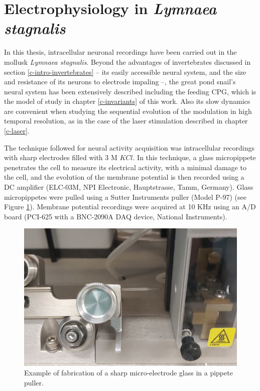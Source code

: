 \section{Electrophysiology in \textit{Lymnaea stagnalis}}

\label{subsec:preparation}
In this thesis, intracellular neuronal recordings have been carried out in the mollusk \textit{Lymnaea stagnalis}. Beyond the advantages of invertebrates discussed in section \ref{c-intro-invertebrates} -- its easily accessible neural system, and the size and resistance of its neurons to electrode impaling --, the great pond snail's neural system has been extensively described including the feeding CPG,  which is the model of study in chapter \ref{c-invariants} of this work. Also its slow dynamics are convenient when studying   the sequential evolution of the modulation in high temporal resolution, as in the case of the laser stimulation described in chapter \ref{c-laser}. 

The technique followed for neural activity acquisition was intracellular recordings with sharp electrodes filled with 3 M $KCl$. %
 In this technique, a glass micropippete penetrates the cell to measure its electrical activity, with a minimal damage to the cell, and the evolution of the  membrane potential is then recorded using a DC amplifier (ELC-03M, NPI Electronic, Hauptstrasse, Tamm, Germany). Glass micropippetes were pulled using a Sutter Instruments puller (Model P-97) (see Figure \ref{fig:electrode}). Membrane potential recordings were acquired at 10 KHz using an A/D board (PCI-625 with a BNC-2090A DAQ device, National Instruments).

\begin{figure}[hbt!]
	\centering
	\includegraphics[width=0.6\linewidth]{img/methods/preparation/electrode4_zoom.jpg}
	\caption{Example of fabrication of a sharp micro-electrode glass in a pippete puller.}
	\label{fig:electrode}
\end{figure}

